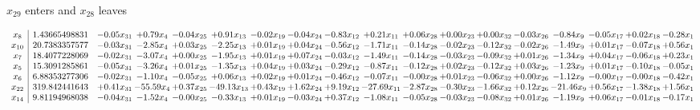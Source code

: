 \documentclass[9pt]{article}
\begin{document}
 $ x_{29} $ enters and $ x_{28} $ leaves 

 \[\begin{array}{c| c c@{\hskip 2pt} c@{\hskip 2pt} c@{\hskip 2pt} c@{\hskip 2pt} c@{\hskip 2pt} c@{\hskip 2pt} c@{\hskip 2pt} c@{\hskip 2pt} c@{\hskip 2pt} c@{\hskip 2pt} c@{\hskip 2pt} c@{\hskip 2pt} c@{\hskip 2pt} c@{\hskip 2pt} c@{\hskip 2pt} c@{\hskip 2pt} }
 x_{8}   &  1.43665498831 & -0.05 x_{31} & +  0.79 x_{4} & -0.04 x_{25} & +  0.91 x_{13} & -0.02 x_{19} & -0.04 x_{24} & -0.83 x_{12} & +  0.21 x_{11} & +  0.06 x_{28} & +  0.00 x_{23} & +  0.00 x_{32} & -0.03 x_{26} & -0.84 x_{9} & -0.05 x_{17} & +  0.02 x_{18} & -0.28 x_{1}\\
 x_{10}   &  20.7383357577 & -0.03 x_{31} & -2.85 x_{4} & +  0.03 x_{25} & -2.25 x_{13} & +  0.01 x_{19} & +  0.04 x_{24} & -0.56 x_{12} & -1.71 x_{11} & -0.14 x_{28} & -0.02 x_{23} & -0.12 x_{32} & -0.02 x_{26} & -1.49 x_{9} & +  0.01 x_{17} & -0.07 x_{18} & +  0.56 x_{1}\\
 x_{7}   &  18.4077228069 & -0.02 x_{31} & -3.07 x_{4} & +  0.00 x_{25} & -1.95 x_{13} & +  0.01 x_{19} & +  0.07 x_{24} & -0.03 x_{12} & -1.49 x_{11} & -0.14 x_{28} & -0.03 x_{23} & -0.09 x_{32} & +  0.01 x_{26} & -1.34 x_{9} & +  0.04 x_{17} & -0.06 x_{18} & +  0.23 x_{1}\\
 x_{5}   &  15.3091285861 & -0.05 x_{31} & -3.26 x_{4} & +  0.01 x_{25} & -1.35 x_{13} & +  0.04 x_{19} & +  0.03 x_{24} & -0.29 x_{12} & -0.87 x_{11} & -0.12 x_{28} & +  0.02 x_{23} & -0.12 x_{32} & +  0.03 x_{26} & -1.23 x_{9} & +  0.01 x_{17} & -0.10 x_{18} & -0.05 x_{1}\\
 x_{6}   &  6.88353277306 & -0.02 x_{31} & -1.10 x_{4} & -0.05 x_{25} & +  0.06 x_{13} & +  0.02 x_{19} & +  0.01 x_{24} & -0.46 x_{12} & -0.07 x_{11} & -0.00 x_{28} & +  0.01 x_{23} & -0.06 x_{32} & +  0.00 x_{26} & -1.12 x_{9} & -0.00 x_{17} & -0.00 x_{18} & -0.42 x_{1}\\
 x_{22}   &  319.842441643 & +  0.41 x_{31} & -55.59 x_{4} & +  0.37 x_{25} & -49.13 x_{13} & +  0.43 x_{19} & +  1.62 x_{24} & +  9.19 x_{12} & -27.69 x_{11} & -2.87 x_{28} & -0.30 x_{23} & -1.66 x_{32} & +  0.12 x_{26} & -21.46 x_{9} & +  0.56 x_{17} & -1.38 x_{18} & +  1.56 x_{1}\\
 x_{14}   &  9.81194968038 & -0.04 x_{31} & -1.52 x_{4} & -0.00 x_{25} & -0.33 x_{13} & +  0.01 x_{19} & -0.03 x_{24} & +  0.37 x_{12} & -1.08 x_{11} & -0.05 x_{28} & -0.03 x_{23} & -0.08 x_{32} & +  0.01 x_{26} & -1.19 x_{9} & +  0.06 x_{17} & -0.01 x_{18} & -0.17 x_{1}\\

\end{array}\]
\end{document}
